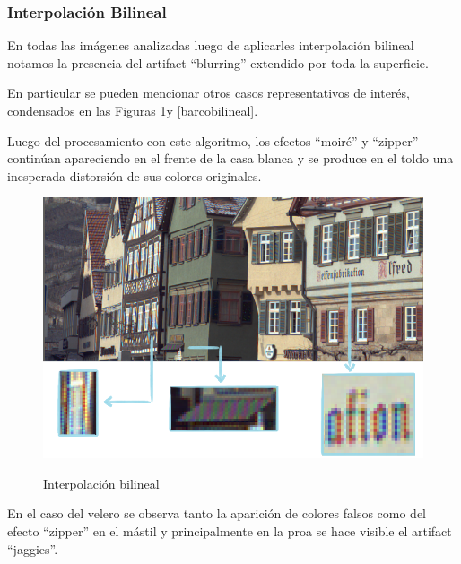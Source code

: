 \documentclass[a4paper]{article}
\begin{document}
\subsubsection{Interpolación Bilineal}

En todas las imágenes analizadas luego de aplicarles interpolación bilineal notamos la presencia del artifact ``blurring'' extendido por toda la superficie.

En particular se pueden mencionar otros casos representativos de interés, condensados en las Figuras \ref{vecinobilineal}y \ref{barcobilineal}.


Luego del procesamiento con este algoritmo, los efectos ``moiré'' y ``zipper'' continúan apareciendo en el frente de la casa blanca y se produce en el toldo una inesperada distorsión de sus colores originales. 

\newpage

\begin{figure}[h!]
	\caption{Interpolación bilineal}
	\begin{center}
	\includegraphics[scale=0.05]{imagenes/vecinobilineal}
	\label{vecinobilineal}
  \end{center}
\end{figure}

En el caso del velero se observa tanto la aparición de colores falsos como del efecto ``zipper'' en el mástil y principalmente en la proa se hace visible el artifact ``jaggies''.
\end{document}
